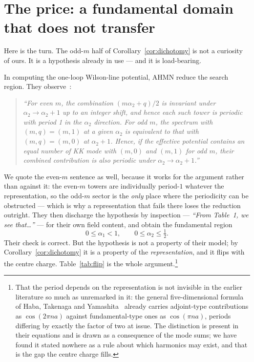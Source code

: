 \documentclass[11pt,a4paper]{article}
\begin{document}
\section{The price: a fundamental domain that does not transfer}\label{sec:domain}
Here is the turn. The odd-$m$ half of Corollary~\ref{cor:dichotomy} is not a curiosity of
ours. It is a hypothesis already in use --- and it is load-bearing.

In computing the one-loop Wilson-line potential, AHMN reduce the search region. They
observe~\cite[\S4.3]{AHMN}:
\begin{quote}\itshape
``For even $m$, the combination $(m\alpha_2+q)/2$ is invariant under
$\alpha_2\to\alpha_2+1$ up to an integer shift, and hence each such tower is periodic with
period 1 in the $\alpha_2$ direction. For odd $m$, the spectrum with $(m,q)=(m,1)$ at a given
$\alpha_2$ is equivalent to that with $(m,q)=(m,0)$ at $\alpha_2+1$. Hence, if the effective
potential contains an equal number of KK mode with $(m,0)$ and $(m,1)$ for odd $m$, their
combined contribution is also periodic under $\alpha_2\to\alpha_2+1$.''
\end{quote}
We quote the even-$m$ sentence as well, because it works for the argument rather than against
it: the even-$m$ towers are individually period-$1$ whatever the representation, so the
odd-$m$ sector is the \emph{only} place where the periodicity can be obstructed --- which is
why a representation that fails there loses the reduction outright.
They then discharge the hypothesis by inspection --- \emph{``From Table~1, we see that\dots''}
--- for their own field content, and obtain the fundamental
region~\cite[Eq.~(4.15)]{AHMN}
\begin{equation}\label{eq:region}
0\le\alpha_1<1,\qquad 0\le\alpha_2\le\tfrac12 .
\end{equation}
Their check is correct. But the hypothesis is not a property of their model; by
Corollary~\ref{cor:dichotomy} it is a property of the \emph{representation}, and it flips
with the centre charge. Table~\ref{tab:flip} is the whole argument.\footnote{That the period
depends on the representation is not invisible in the earlier literature so much as
unremarked in it: the general five-dimensional formula of Haba, Takenaga and
Yamashita~\cite{HTY} already carries adjoint-type contributions as $\cos(2\pi n a)$ against
fundamental-type ones as $\cos(\pi n a)$, periods differing by exactly the factor of two at
issue. The distinction is present in their equations and is drawn as a consequence of the
mode sums; we have found it stated nowhere as a rule about which harmonics may exist, and
that is the gap the centre charge fills.}
\end{document}
